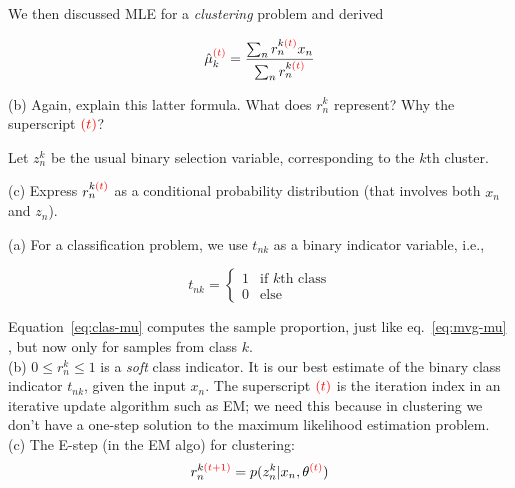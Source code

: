 \documentclass[a4paper]{article}
\def\r#1{{\color{red}#1}}
\begin{document}
\begin{ExerciseList}
We then discussed MLE for a \emph{clustering} problem and derived

\begin{equation}
\hat \mu_k^{\r{(t)}} = \frac{\sum_n r_n^{k\r{(t)}} x_n}{\sum_n r_n^{k\r{(t)}}}
\label{eq:clus-mu}
\end{equation}

(b) Again, explain this latter formula. What does $r_n^k$ represent? Why the superscript $\r{(t)}$?

\medskip
Let $z_n^k$ be the usual binary selection variable, corresponding to the $k$th cluster.

(c) Express $r_n^{k\r{(t)}}$ as a conditional probability distribution (that involves both $x_n$ and $z_n$).



\Answer[ref={ex:3}]

(a) For a classification problem, we use $t_{nk}$ as a binary indicator variable, i.e.,

 $$ t_{nk} = \begin{cases} 1 & \text{if $k$th class} \\
    0 & \text{else}
    \end{cases}$$

Equation~\ref{eq:clas-mu} computes the sample proportion, just like eq.~\ref{eq:mvg-mu} , but now only for samples from class $k$.\\

(b) $0 \leq r_n^k \leq 1$ is a \emph{soft} class indicator. It is our best estimate of the binary class indicator $t_{nk}$, given the input $x_n$. The superscript $\r{(t)}$ is the iteration index in an iterative update algorithm such as EM; we need this because in clustering we don't have a one-step solution to the maximum likelihood estimation problem.\\

(c) The E-step (in the EM algo) for clustering:
 $$r_n^{k\r{(t+1)}} = p(z_n^k|x_n,\theta^{\r{(t)}})$$



\end{ExerciseList}
\end{document}
